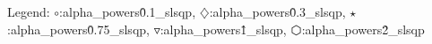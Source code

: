 Legend: {\color{NavyBlue}$\circ$}:alpha\_powers\^0.1\_slsqp, {\color{Magenta}$\diamondsuit$}:alpha\_powers\^0.3\_slsqp, {\color{Orange}$\star$}:alpha\_powers\^0.75\_slsqp, {\color{CornflowerBlue}$\triangledown$}:alpha\_powers\^1\_slsqp, {\color{red}$\varhexagon$}:alpha\_powers\^2\_slsqp